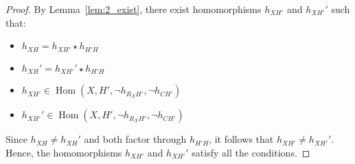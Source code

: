 \begin{proof}
   By Lemma~\ref{lem:2_exist}, there exist homomorphisms \( h_{XH'} \) and \( h_{XH'}' \) such that:
   \begin{itemize}
       \item \( h_{XH} \mathop{=} h_{XH'} \mathop{\star} h_{H'H} \)
       \item \( h_{XH}' \mathop{=} h_{XH'}' \mathop{\star} h_{H'H} \)
       \item \( h_{XH'} \mathop{\in} \operatorname{Hom}(X, H', \lnot h_{R_XH'}, \lnot h_{CH'}) \)
       \item \( h_{XH'}' \mathop{\in} \operatorname{Hom}(X, H', \lnot h_{R_XH'}, \lnot h_{CH'}) \)
   \end{itemize}
    
   Since \( h_{XH} \mathop{\neq} h_{XH}' \) and both factor through \( h_{H'H} \), it follows that \( h_{XH'} \mathop{\neq} h_{XH'}' \). Hence, the homomorphisms \( h_{XH'} \) and \( h_{XH'}' \) satisfy all the conditions.
\end{proof}
